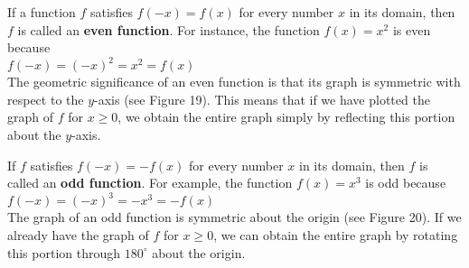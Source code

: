 \documentclass{sebase}
\begin{document}
If a function $f$ satisfies $f(-x)=f(x)$ for every number $x$ in its domain,
then $f$ is called an \textbf{even function}. For instance, the function $%
f(x)=x^{2}$ is even because 
\\[6pt]
\hspace*{\fill}$f(-x)=(-x)^{2}=x^{2}=f(x)$\hspace*{\fill}\\[6pt]
The geometric significance of an even function is that its graph is
symmetric with respect to the $y$-axis (see Figure 19). This means that if
we have plotted the graph of $f$ for $x\geq 0$, we obtain the entire graph
simply by reflecting this portion about the $y$-axis.

If $f$ satisfies $f(-x)=-f(x)$ for every number $x$ in its domain, then $f$
is called an \textbf{odd function}. For example, the function $f(x)=x^{3}$
is odd because\\[6pt]
\hspace*{\fill}$f(-x)=(-x)^{3}=-x^{3}=-f(x)$\hspace*{\fill}\\[6pt]
The graph of an odd function is symmetric about the origin (see Figure 20).
If we already have the graph of $f$ for $x\geq 0$, we can obtain the entire
graph by rotating this portion through $180^{\circ }$ about the origin.
\end{document}
